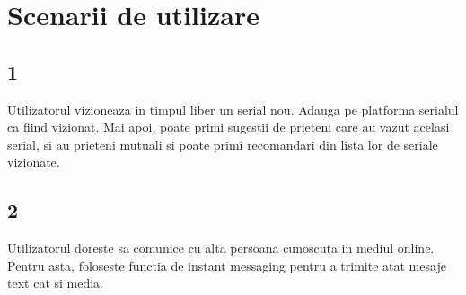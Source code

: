 \chapter{Scenarii de utilizare}
    \section{1}
    Utilizatorul vizioneaza in timpul liber un serial nou. Adauga pe platforma serialul ca fiind vizionat. Mai apoi, poate primi sugestii de prieteni care au vazut acelasi serial, si au prieteni mutuali si poate primi recomandari din lista lor de seriale vizionate.
    \section{2}
    Utilizatorul doreste sa comunice cu alta persoana cunoscuta in mediul online. Pentru asta, foloseste functia de instant messaging pentru a trimite atat mesaje text cat si media.
\newpage